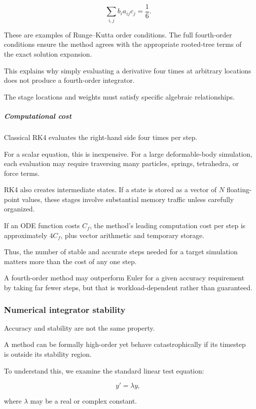 \[
\sum_{i,j}b_i a_{ij}c_j=\frac16.
\]

These are examples of Runge--Kutta order conditions. The full fourth-order conditions ensure the method agrees with the appropriate rooted-tree terms of the exact solution expansion.

This explains why simply evaluating a derivative four times at arbitrary locations does not produce a fourth-order integrator.

The stage locations and weights must satisfy specific algebraic relationships.

\subparagraph{Computational cost}\label{02-foundations-ii-ch025-computational-cost}

Classical RK4 evaluates the right-hand side four times per step.

For a scalar equation, this is inexpensive. For a large deformable-body simulation, each evaluation may require traversing many particles, springs, tetrahedra, or force terms.

RK4 also creates intermediate states. If a state is stored as a vector of \(N\) floating-point values, these stages involve substantial memory traffic unless carefully organized.

If an ODE function costs \(C_f\), the method's leading computation cost per step is approximately \(4C_f\), plus vector arithmetic and temporary storage.

Thus, the number of stable and accurate steps needed for a target simulation matters more than the cost of any one step.

A fourth-order method may outperform Euler for a given accuracy requirement by taking far fewer steps, but that is workload-dependent rather than guaranteed.

\subsubsection{Numerical integrator stability}\label{02-foundations-ii-ch025-numerical-integrator-stability}

Accuracy and stability are not the same property.

A method can be formally high-order yet behave catastrophically if its timestep is outside its stability region.

To understand this, we examine the standard linear test equation:

\[
\boxed{y'=\lambda y},
\]

where \(\lambda\) may be a real or complex constant.

